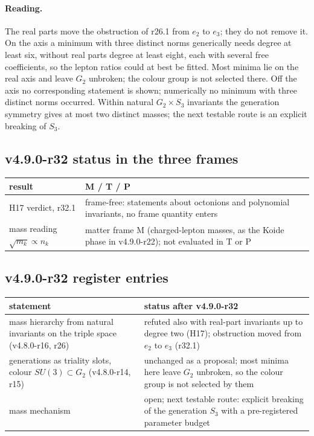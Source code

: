 \paragraph{Reading.}
The real parts move the obstruction of r26.1 from \(e_2\) to \(e_3\); they do not remove it.  On the axis a minimum with
three distinct norms generically needs degree at least six, without real parts degree at least eight, each with
several free coefficients, so the lepton ratios could at best be fitted.  Most minima lie on the real axis and leave
\(G_2\) unbroken; the colour group is not selected there.  Off the axis no corresponding statement is shown; numerically
no minimum with three distinct norms occurred.  Within natural \(G_2\times S_3\) invariants the generation symmetry gives
at most two distinct masses; the next testable route is an explicit breaking of \(S_3\).

\subsection*{v4.9.0-r32 status in the three frames}
\label{subsec:v490-r32-frames}

\begin{center}
\small
\begin{tabular}{@{}>{\raggedright\arraybackslash}p{}>{\raggedright\arraybackslash}p{}@{}}
\toprule
result & M / T / P\\
\midrule
H17 verdict, r32.1 & frame-free: statements about octonions and polynomial invariants, no frame quantity enters\\
mass reading \(\sqrt{m_k}\propto n_k\) & matter frame M (charged-lepton masses, as the Koide phase in v4.9.0-r22); not evaluated in T or P\\
\bottomrule
\end{tabular}
\end{center}

\subsection*{v4.9.0-r32 register entries}
\label{subsec:v490-r32-register}

\begin{center}
\small
\begin{tabular}{@{}>{\raggedright\arraybackslash}p{}>{\raggedright\arraybackslash}p{}@{}}
\toprule
statement & status after v4.9.0-r32\\
\midrule
mass hierarchy from natural invariants on the triple space (v4.8.0-r16, r26) & refuted also with real-part invariants up to degree two (H17); obstruction moved from \(e_2\) to \(e_3\) (r32.1)\\
generations as triality slots, colour \(SU(3)\subset G_2\) (v4.8.0-r14, r15) & unchanged as a proposal; most minima here leave \(G_2\) unbroken, so the colour group is not selected by them\\
mass mechanism & open; next testable route: explicit breaking of the generation \(S_3\) with a pre-registered parameter budget\\
\bottomrule
\end{tabular}
\end{center}

